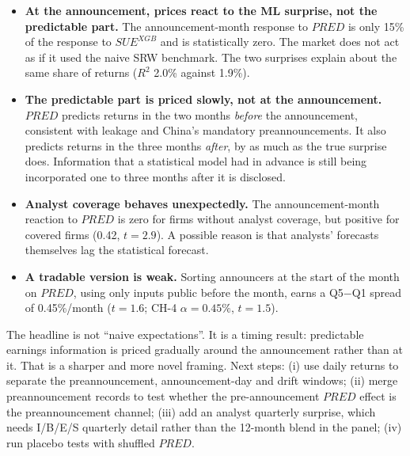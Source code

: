 \begin{itemize}
\item \textbf{At the announcement, prices react to the ML surprise, not the predictable part.} The announcement-month
  response to $PRED$ is only 15\% of the response to $SUE^{XGB}$ and is statistically zero. The market does not act
  as if it used the naive SRW benchmark. The two surprises explain about the same share of returns ($R^2$ 2.0\%
  against 1.9\%).
\item \textbf{The predictable part is priced slowly, not at the announcement.} $PRED$ predicts returns in the two
  months \emph{before} the announcement, consistent with leakage and China's mandatory preannouncements. It also
  predicts returns in the three months \emph{after}, by as much as the true surprise does. Information that a
  statistical model had in advance is still being incorporated one to three months after it is disclosed.
\item \textbf{Analyst coverage behaves unexpectedly.} The announcement-month reaction to $PRED$ is zero for firms
  without analyst coverage, but positive for covered firms (0.42, $t=2.9$). A possible reason is that analysts'
  forecasts themselves lag the statistical forecast.
\item \textbf{A tradable version is weak.} Sorting announcers at the start of the month on $PRED$, using only
  inputs public before the month, earns a Q5$-$Q1 spread of 0.45\%/month ($t=1.6$; CH-4 $\alpha=0.45\%$, $t=1.5$).
\end{itemize}

The headline is not ``naive expectations''. It is a timing result: predictable earnings information is priced
gradually around the announcement rather than at it. That is a sharper and more novel framing. Next steps:
(i) use daily returns to separate the preannouncement, announcement-day and drift windows; (ii) merge
preannouncement records to test whether the pre-announcement $PRED$ effect is the preannouncement channel; (iii)
add an analyst quarterly surprise, which needs I/B/E/S quarterly detail rather than the 12-month blend in the
panel; (iv) run placebo tests with shuffled $PRED$.

